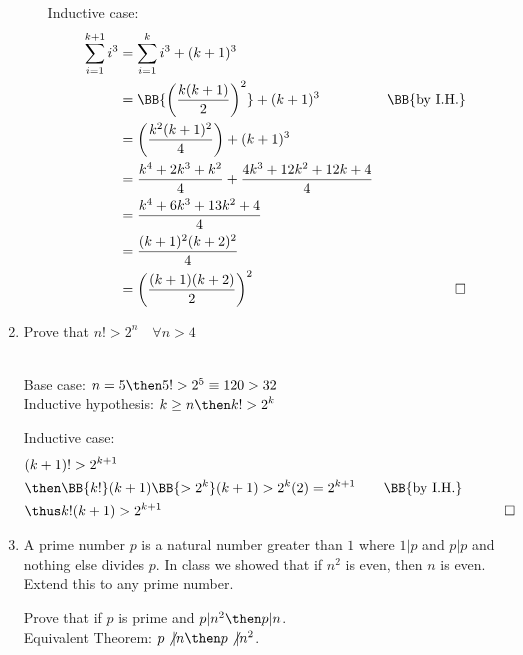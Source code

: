 \documentclass[basic, header]{nosvagor-notes}
\begin{document}
\begin{enumerate}[itemsep=4em]
\begin{enumerate}[leftmargin=2em]
        Inductive case:
        \begin{align*}
          \sum_{i=1}^{k+1} i^3 &=
          \sum_{i=1}^{k} i^3
          + (k+1)^3 \\
          &= \BB{\left( \frac{k (k+1)}{2}\right)^2} + (k+1)^3
          & \text{\BB{by I.H.}} \\
          &= \left( \frac{k^2 (k+1)^2}{4}\right) + (k+1)^3 \\
          &=  \frac{k^4 + 2k^3+k^2}{4} +
          \frac{4k^3+12k^2+12k+4}{4} \\
          &=  \frac{k^4 + 6k^3+13k^2 + 4}{4} \\
          &= \frac{(k+1)^2 (k+2)^2}{4}\\
          &= \left(\frac{(k+1)(k+2)}{2}\right)^2
          & \qed
        \end{align*}

    \end{enumerate}

  \newpage %

  \item Prove that \(\displaystyle n! > 2^n \quad \forall n > 4 \)

    \\
    Base case: \(n = 5 \then 5! > 2^5 \equiv 120 > 32 \) \\
    Inductive hypothesis: \(\displaystyle
    k \geq n
    \then
    k! > 2^k
    \)

    Inductive case:
    \begin{align*}
      &(k+1)! > 2^{k+1} \\
      &\then \BB{k!}(k+1)
      \BB{> 2^{k}}(k+1)
      > 2^k(2)
      = 2^{k+1}
      \qquad \text{\BB{by I.H.}} \\
      &\thus k!(k+1) > 2^{k+1}
      & \qed
    \end{align*}

    \vspace{8em}

  \item A prime number \(p\) is a natural number greater than \(1\) where
    \(1|p\) and \(p|p\) and nothing else divides \(p\). In class we showed that
    if \(n^2\) is even, then \(n\) is even. Extend this to any prime number.

    Prove that if \(p\) is prime and \(p|n^2 \then p|n\).\\
    Equivalent Theorem: \(p \not| n \then p \not| n^2\).


\end{enumerate}
\end{document}
